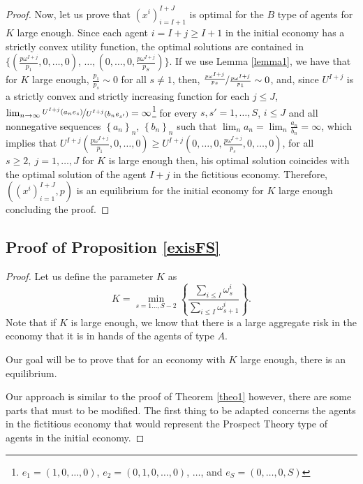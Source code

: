 \documentclass[pdftex]{article}
\numberwithin{equation}{section}
\theoremstyle{th}
\newtheorem{proof lemma}{{Proof Lemma}.}
\theoremstyle{definition}
\begin{document}
{\begin{proof}
Now, let us prove that $\left(x^{i}\right)_{i=I+1}^{I+J}$ is
optimal for the $B$ type of agents for $K$ large enough. Since each
agent $i=I+j\geq{I+1}$ in the initial economy has a strictly convex
utility function, the optimal solutions are contained in $\Bigg\{\left(\frac{p\omega^{I+j}}{p_{1}},0,\dots,0\right)$,
$\dots,\left(0,\dots,0,\frac{p\omega^{I+j}}{p_{S}}\right)\Bigg\}$.
If we use Lemma \ref{lemma1}, we have that for $K$ large enough, $\frac{p_{1}}{p_{s}}\sim0$ for all $s\neq1$, then, $\nicefrac{\frac{p\omega^{I+j}}{p_{s}}}{\frac{p\omega^{I+j}}{p_{1}}}\sim0$, and, since $U^{I+j}$
is a strictly convex and strictly increasing function for each $j\leq{J}$, $\lim_{n\rightarrow\infty}\nicefrac{U^{I+j}(a_n e_s)}{U^{I+j}(b_n e_{s'})}=\infty$\footnote{$e_1=(1,0,\dots,0)$, $e_2=(0,1,0,\dots,0)$, $\dots$, and $e_S=(0,\dots,0,S)$} for every $s,s'=1,\dots,S$, $i\leq J$ and all nonnegative sequences $\left\{a_n\right\}_n$, $\left\{b_n\right\}_n$ such that $\lim_na_n=\lim_n\frac{a_n}{b_n}=\infty$, which implies that $U^{I+j}\left(\frac{p\omega^{I+j}}{p_{1}},0,\dots,0\right)\geq{U}^{I+j}\left(0,\dots,0,\frac{p\omega^{I+j}}{p_{s}},0,\dots,0\right)$,
for all $s\geq2,\ j=1,\dots,J$ for $K$ is large enough then, his optimal
solution coincides with the optimal solution of the agent $I+j$ in
the fictitious economy. Therefore, $\left(\left(x^{i}\right)_{i=1}^{I+J},p\right)$
is an equilibrium for the initial economy for $K$ large enough concluding the proof.\end{proof}

\subsection{Proof of Proposition \ref{exisFS}}

\label{appC}

\begin{proof}
Let us define the parameter $K$ as
\begin{equation}
\label{defKp}
K=\min_{s=1\dots,S-2}\left\{\frac{\sum_{i\leq I}\omega^i_s}{\sum_{i\leq I}\omega^i_{s+1}}\right\}.
\end{equation}
Note that if $K$ is large enough, we know that there is a large aggregate risk in the economy that it is in hands of the agents of type $A$.

Our goal will be to prove that for an economy with $K$ large enough, there is an equilibrium.

Our approach is similar to the proof of Theorem \ref{theo1} however,
there are some parts that must to be modified. The first thing to
be adapted concerns the agents in the fictitious economy that would represent
the Prospect Theory type of agents in the initial economy.


\end{proof}}
\end{document}
